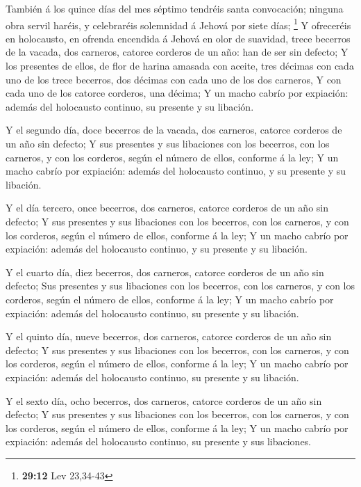  También á los quince días del mes séptimo tendréis santa
convocación; ninguna obra servil haréis, y celebraréis solemnidad á
Jehová por siete días; \footnote{\textbf{29:12} Lev 23,34-43}
 Y ofreceréis en holocausto, en ofrenda encendida á Jehová
en olor de suavidad, trece becerros de la vacada, dos carneros, catorce
corderos de un año: han de ser sin defecto;  Y los
presentes de ellos, de flor de harina amasada con aceite, tres décimas
con cada uno de los trece becerros, dos décimas con cada uno de los dos
carneros,  Y con cada uno de los catorce corderos, una
décima;  Y un macho cabrío por expiación: además del
holocausto continuo, su presente y su libación.

 Y el segundo día, doce becerros de la vacada, dos
carneros, catorce corderos de un año sin defecto;  Y sus
presentes y sus libaciones con los becerros, con los carneros, y con los
corderos, según el número de ellos, conforme á la ley;  Y
un macho cabrío por expiación: además del holocausto continuo, y su
presente y su libación.

 Y el día tercero, once becerros, dos carneros, catorce
corderos de un año sin defecto;  Y sus presentes y sus
libaciones con los becerros, con los carneros, y con los corderos, según
el número de ellos, conforme á la ley;  Y un macho cabrío
por expiación: además del holocausto continuo, y su presente y su
libación.

 Y el cuarto día, diez becerros, dos carneros, catorce
corderos de un año sin defecto;  Sus presentes y sus
libaciones con los becerros, con los carneros, y con los corderos, según
el número de ellos, conforme á la ley;  Y un macho cabrío
por expiación: además del holocausto continuo, su presente y su
libación.

 Y el quinto día, nueve becerros, dos carneros, catorce
corderos de un año sin defecto;  Y sus presentes y sus
libaciones con los becerros, con los carneros, y con los corderos, según
el número de ellos, conforme á la ley;  Y un macho cabrío
por expiación: además del holocausto continuo, su presente y su
libación.

 Y el sexto día, ocho becerros, dos carneros, catorce
corderos de un año sin defecto;  Y sus presentes y sus
libaciones con los becerros, con los carneros, y con los corderos, según
el número de ellos, conforme á la ley;  Y un macho cabrío
por expiación: además del holocausto continuo, su presente y sus
libaciones.

